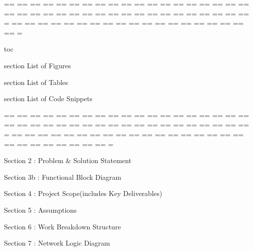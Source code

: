 \documentclass[12pt, letterpaper]{article}
\begin{document}
    == == == == == == == == == == == == == == == == == == == == == == == == ==
    == == == == == == == == == == == == ==
    = %
      == == == == == == == == == == == == == == == == == == ==
    =



\newpage
{}
{ toc }
\tableofcontents

\newpage
{}
{} {
  section
}
{ List of Figures }
\listoffigures

\newpage
{}
{} {
  section
}
{ List of Tables }
\listoftables

\newpage
{}
{} {
  section
}
{ List of Code Snippets }
\lstlistoflistings

    == == == == == == == == == == == == == == == == == == == == == == == == ==
    == == == == == == == == == == == == ==
    = %
      == == == == == == == == == == == == == == == == == == == == == == == == ==
      ==
    =
\newpage
{}



                      Section 2 : Problem &
    Solution Statement
\newpage


\newpage


                      Section 3b
    : Functional Block Diagram
\newpage


      Section 4 : Project Scope(includes Key Deliverables)
\newpage


                  Section 5 : Assumptions
\newpage


                              Section 6 : Work Breakdown Structure
\newpage


                                          Section 7 : Network Logic Diagram
\newpage

\end{document}
